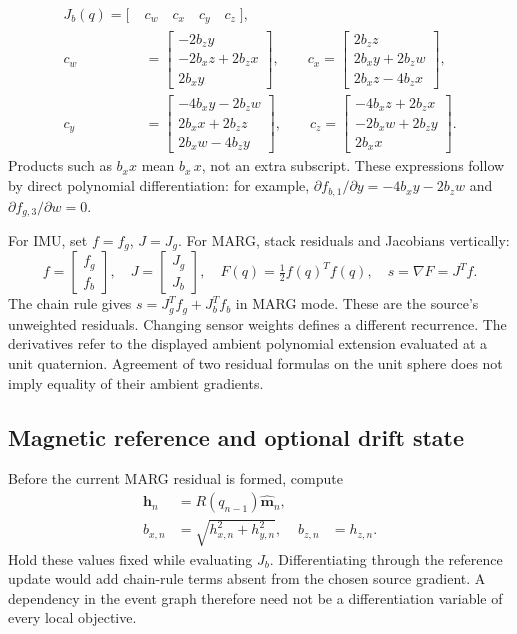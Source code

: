 \begin{equation}
\begin{split}
J_b(q)=\bigl[\;&c_w\quad c_x\quad c_y\quad c_z\;\bigr],\\
c_w&=\begin{bmatrix}-2b_zy\\-2b_xz+2b_zx\\2b_xy\end{bmatrix},\qquad
c_x=\begin{bmatrix}2b_zz\\2b_xy+2b_zw\\2b_xz-4b_zx\end{bmatrix},\\
c_y&=\begin{bmatrix}-4b_xy-2b_zw\\2b_xx+2b_zz\\2b_xw-4b_zy\end{bmatrix},\qquad
c_z=\begin{bmatrix}-4b_xz+2b_zx\\-2b_xw+2b_zy\\2b_xx\end{bmatrix}.
\end{split}
\label{eq:mad-jb}
\end{equation}
Products such as $b_xx$ mean $b_x\,x$, not an extra subscript. These expressions
follow by direct polynomial differentiation: for example,
$\partial f_{b,1}/\partial y=-4b_xy-2b_zw$ and
$\partial f_{g,3}/\partial w=0$.

For IMU, set $f=f_g$, $J=J_g$. For MARG, stack residuals and Jacobians vertically:
\[
f=\begin{bmatrix}f_g\\f_b\end{bmatrix},\quad
J=\begin{bmatrix}J_g\\J_b\end{bmatrix},\quad
F(q)=\tfrac12 f(q)^Tf(q),\quad
s=\nabla F=J^Tf.
\]
The chain rule gives $s=J_g^Tf_g+J_b^Tf_b$ in MARG mode. These are the source's
unweighted residuals. Changing sensor weights defines a different recurrence.
The derivatives refer to the displayed ambient polynomial extension evaluated
at a unit quaternion. Agreement of two residual formulas on the unit sphere
does not imply equality of their ambient gradients.

\subsection{Magnetic reference and optional drift state}
Before the current MARG residual is formed, compute
\begin{align}
\boldsymbol h_n&=R(q_{n-1})\widehat{\boldsymbol m}_n,\\
b_{x,n}&=\sqrt{h_{x,n}^2+h_{y,n}^2},&b_{z,n}&=h_{z,n}.
\label{eq:mad-reference}
\end{align}
Hold these values fixed while evaluating $J_b$. Differentiating through the
reference update would add chain-rule terms absent from the chosen source
gradient. A dependency in the event graph therefore need not be a differentiation
variable of every local objective.

